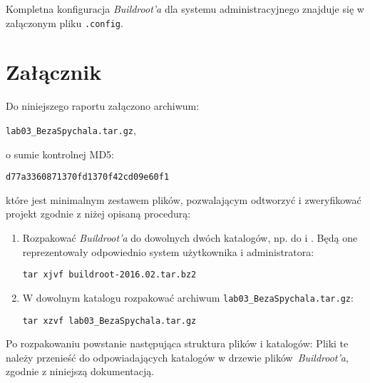 \documentclass{article}
\newcommand{\labnumber}{3}
\begin{document}
Kompletna konfiguracja \emph{Buildroot'a} dla systemu administracyjnego znajduje się w załączonym pliku \texttt{.config}.


\section{Załącznik}

Do niniejszego raportu załączono archiwum:
\begin{center}
\texttt{lab0\labnumber\_BezaSpychala.tar.gz},
\end{center}
o sumie kontrolnej MD5:
\begin{center}
\texttt{d77a3360871370fd1370f42cd09e60f1}
\end{center}
które jest minimalnym zestawem plików, pozwalającym odtworzyć i zweryfikować projekt zgodnie z niżej opisaną procedurą:
\begin{enumerate}
\item Rozpakować \emph{Buildroot'a} do dowolnych dwóch katalogów, np. do  i . Będą one reprezentowały odpowiednio system użytkownika i administratora:
\begin{center}
\texttt{tar xjvf buildroot-2016.02.tar.bz2}
\end{center}

\item W dowolnym katalogu rozpakować archiwum \texttt{lab0\labnumber\_BezaSpychala.tar.gz}:
\begin{center}
\texttt{tar xzvf lab0\labnumber\_BezaSpychala.tar.gz}
\end{center}
\end{enumerate}

Po rozpakowaniu powstanie następująca struktura plików i katalogów:
Pliki te należy przenieść do odpowiadających katalogów w drzewie plików~\emph{Buildroot'a}, zgodnie z niniejszą dokumentacją.




\end{document}
